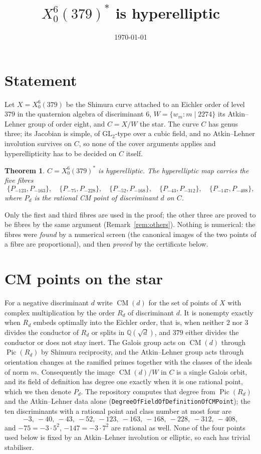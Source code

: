 \documentclass[11pt,reqno]{amsart}
\theoremstyle{plain}
\newtheorem{theorem}{Theorem}[section]
\theoremstyle{definition}
\DeclareMathOperator{\Pic}{Pic}
\DeclareMathOperator{\CM}{CM}
\newcommand{\Q}{\mathbb{Q}}
\begin{document}
\title{$X_0^6(379)^*$ is hyperelliptic}
\author{}
\date{\today}
\maketitle

\section{Statement}

Let $X=X_0^6(379)$ be the Shimura curve attached to an Eichler order of level $379$ in the
quaternion algebra of discriminant $6$, $W=\{w_m : m\mid 2274\}$ its Atkin--Lehner group of order
eight, and $C=X/W$ the star. The curve $C$ has genus three; its Jacobian is simple, of
$\mathrm{GL}_2$-type over a cubic field, and no Atkin--Lehner involution survives on $C$, so none of
the cover arguments applies and hyperellipticity has to be decided on $C$ itself.

\begin{theorem}\label{thm:main}
$C=X_0^6(379)^*$ is hyperelliptic. The hyperelliptic map carries the five fibres
\[
\{P_{-123},P_{-163}\},\quad \{P_{-75},P_{-228}\},\quad \{P_{-52},P_{-168}\},\quad
\{P_{-43},P_{-312}\},\quad \{P_{-147},P_{-408}\},
\]
where $P_d$ is the rational CM point of discriminant $d$ on $C$.
\end{theorem}

Only the first and third fibres are used in the proof; the other three are proved to be fibres by
the same argument (Remark~\ref{rem:others}). Nothing is numerical: the fibres were \emph{found}
by a numerical screen (the canonical images of the two points of a fibre are proportional), and
then \emph{proved} by the certificate below.

\section{CM points on the star}

For a negative discriminant $d$ write $\CM(d)$ for the set of points of $X$ with complex
multiplication by the order $R_d$ of discriminant $d$. It is nonempty exactly when $R_d$ embeds
optimally into the Eichler order, that is, when neither $2$ nor $3$ divides the conductor of $R_d$
or splits in $\Q(\sqrt d)$, and $379$ either divides the conductor or does not stay inert. The
Galois group acts on $\CM(d)$ through $\Pic(R_d)$ by Shimura reciprocity, and the Atkin--Lehner
group acts through orientation changes at the ramified primes together with the classes of the
ideals of norm $m$. Consequently the image $\CM(d)/W$ in $C$ is a single Galois orbit, and its
field of definition has degree one exactly when it is one rational point, which we then denote
$P_d$. The repository computes that degree from $\Pic(R_d)$ and the Atkin--Lehner data alone
(\texttt{DegreeOfFieldOfDefinitionOfCMPoint}); the ten discriminants with a rational point and
class number at most four are
\[
-3,\ -40,\ -43,\ -52,\ -123,\ -163,\ -168,\ -228,\ -312,\ -408,
\]
and $-75=-3\cdot5^2$, $-147=-3\cdot7^2$ are rational as well. None of the four points used below is
fixed by an Atkin--Lehner involution or elliptic, so each has trivial stabiliser.
\end{document}
